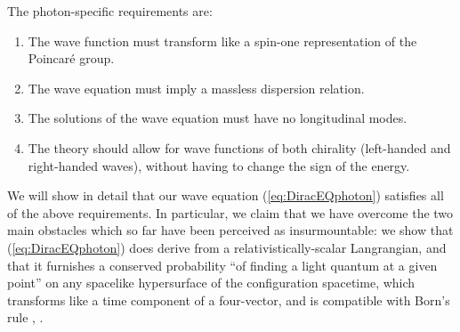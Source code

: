 \documentclass[11pt]{article}
\theoremstyle{definition}
\newcommand{\refeq}[1]{(\ref{#1})}
\numberwithin{equation}{section}
\begin{document}
 The photon-specific requirements are:
\begin{enumerate}
\item The wave function must transform like a spin-one representation of the Poincar\'e group.
\item The wave equation must imply a massless dispersion relation.
\item The solutions of the wave equation must have no longitudinal modes.
\item The theory should allow for wave functions of both chirality (left-handed and right-handed waves), without having to change 
the sign of the energy.
\end{enumerate}

 We will show in detail that our wave equation \refeq{eq:DiracEQphoton} satisfies all of the above requirements.
 In particular, we claim that we have overcome the two main obstacles which so far have been perceived as insurmountable:
we show that \refeq{eq:DiracEQphoton} does derive from a relativistically-scalar Langrangian, 
and that it furnishes a conserved probability  ``of finding a light quantum at a given point'' on any spacelike hypersurface 
of the configuration spacetime,  which transforms like a time component of a four-vector, and is
compatible with Born's rule \cite{BornsPSISQUAREpapersA, BornsPSISQUAREpapersB}, \cite{Dirac1930}.
\end{document}

